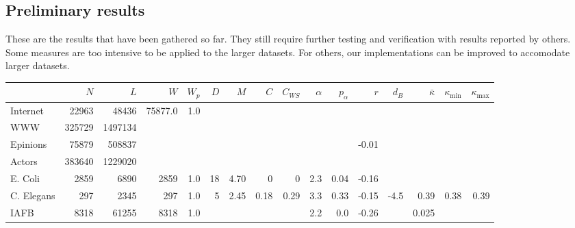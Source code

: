\documentclass{article}
\theoremstyle{definition}
\begin{document}
\begin{landscape}

\section*{Preliminary results}

These are the results that have been gathered so far. They still require further testing and verification with results reported by others. Some measures are too intensive to be applied to the larger datasets. For others, our implementations can be improved to accomodate larger datasets.

\begin{tabular}{l | r r r r r r r r r r r r r r r }
  \hline
    & $N$ & $L$ & $W$ & $W_p$ & $D$ & $M$ & $C$ & $C_{WS}$ & $\alpha$ & $p_\alpha$ & $r$ & $d_B$ & $\bar{\kappa}$ & $\kappa_{\mbox{min}}$ & $\kappa_{\mbox{max}}$  \\
    \hline
 Internet & 22963 & 48436 & 75877.0 & 1.0 & & & & & & & & & & & \\   
 WWW & 325729 & 1497134 & & & & & & & & & & & & & \\
 Epinions & 75879 & 508837 & & & & & & & & & -0.01 & & & & \\ 
 Actors  & 383640 & 1229020 & & & & & & & & & & & & & \\
 E. Coli  & 2859 & 6890 & 2859 & 1.0 & 18 & 4.70 & 0 & 0 & \color{gray} 2.3 & 0.04 & -0.16 & & & & \\
 C. Elegans  & 297 & 2345 & 297 & 1.0 & 5 & 2.45 & 0.18 & 0.29 & 3.3 & 0.33 & -0.15 & -4.5 & 0.39 & 0.38 & 0.39 \\
 IAFB  & 8318 & 61255 & 8318 & 1.0 & & & & & \color{gray} 2.2 & 0.0 & -0.26 & & 0.025 & &  \\ 
 \hline

\end{tabular}

\end{landscape}



\end{document}
